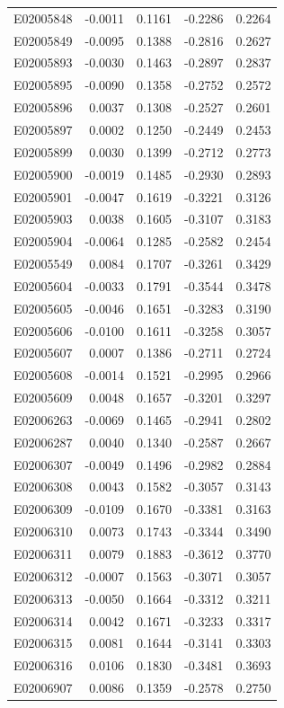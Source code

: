 \documentclass[11pt, a4paper]{article}
\begin{document}
\begin{longtable}{lrrrr}
E02005848 & -0.0011 & 0.1161 & -0.2286 & 0.2264 \\
E02005849 & -0.0095 & 0.1388 & -0.2816 & 0.2627 \\
E02005893 & -0.0030 & 0.1463 & -0.2897 & 0.2837 \\
E02005895 & -0.0090 & 0.1358 & -0.2752 & 0.2572 \\
E02005896 & 0.0037 & 0.1308 & -0.2527 & 0.2601 \\
E02005897 & 0.0002 & 0.1250 & -0.2449 & 0.2453 \\
E02005899 & 0.0030 & 0.1399 & -0.2712 & 0.2773 \\
E02005900 & -0.0019 & 0.1485 & -0.2930 & 0.2893 \\
E02005901 & -0.0047 & 0.1619 & -0.3221 & 0.3126 \\
E02005903 & 0.0038 & 0.1605 & -0.3107 & 0.3183 \\
E02005904 & -0.0064 & 0.1285 & -0.2582 & 0.2454 \\
E02005549 & 0.0084 & 0.1707 & -0.3261 & 0.3429 \\
E02005604 & -0.0033 & 0.1791 & -0.3544 & 0.3478 \\
E02005605 & -0.0046 & 0.1651 & -0.3283 & 0.3190 \\
E02005606 & -0.0100 & 0.1611 & -0.3258 & 0.3057 \\
E02005607 & 0.0007 & 0.1386 & -0.2711 & 0.2724 \\
E02005608 & -0.0014 & 0.1521 & -0.2995 & 0.2966 \\
E02005609 & 0.0048 & 0.1657 & -0.3201 & 0.3297 \\
E02006263 & -0.0069 & 0.1465 & -0.2941 & 0.2802 \\
E02006287 & 0.0040 & 0.1340 & -0.2587 & 0.2667 \\
E02006307 & -0.0049 & 0.1496 & -0.2982 & 0.2884 \\
E02006308 & 0.0043 & 0.1582 & -0.3057 & 0.3143 \\
E02006309 & -0.0109 & 0.1670 & -0.3381 & 0.3163 \\
E02006310 & 0.0073 & 0.1743 & -0.3344 & 0.3490 \\
E02006311 & 0.0079 & 0.1883 & -0.3612 & 0.3770 \\
E02006312 & -0.0007 & 0.1563 & -0.3071 & 0.3057 \\
E02006313 & -0.0050 & 0.1664 & -0.3312 & 0.3211 \\
E02006314 & 0.0042 & 0.1671 & -0.3233 & 0.3317 \\
E02006315 & 0.0081 & 0.1644 & -0.3141 & 0.3303 \\
E02006316 & 0.0106 & 0.1830 & -0.3481 & 0.3693 \\
E02006907 & 0.0086 & 0.1359 & -0.2578 & 0.2750 \\
\end{longtable}
\end{document}
